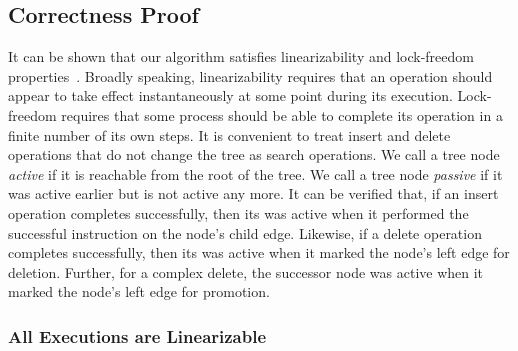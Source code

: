 \subsection{Correctness Proof}
It can be shown that our algorithm satisfies linearizability and lock-freedom properties~\cite{HerSha:2012:Book}. Broadly speaking, linearizability requires that an operation should appear to take effect instantaneously at some point during its execution.  Lock-freedom requires that some process should be able to complete its operation in a finite number of its own steps.
It is convenient to treat insert and delete operations that do not change the tree as search operations. 
We call a tree node \emph{active} if it is reachable from the root of the tree. We call a tree node  \emph{passive} if it was active earlier but is not active any more.
It can be verified that, if an insert operation completes successfully, then  its \targetnode{} was active when it performed the successful \CAS{} instruction on the node's child edge.
Likewise, if a delete operation completes successfully, then its \targetnode{} was active when it marked the node's left edge for deletion. Further, for a complex delete, 
the successor node was active when it marked the node's left edge for promotion.




\subsubsection{All Executions are Linearizable}

